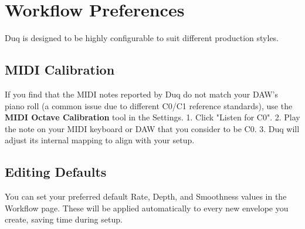 \chapter{Workflow Preferences}
\label{ch:workflow_preferences}

Duq is designed to be highly configurable to suit different production styles.

\section{MIDI Calibration}
If you find that the MIDI notes reported by Duq do not match your DAW's piano roll (a common issue due to different C0/C1 reference standards), use the \textbf{MIDI Octave Calibration} tool in the Settings.
1. Click "Listen for C0".
2. Play the note on your MIDI keyboard or DAW that you consider to be C0.
3. Duq will adjust its internal mapping to align with your setup.

\section{Editing Defaults}
You can set your preferred default Rate, Depth, and Smoothness values in the Workflow page. These will be applied automatically to every new envelope you create, saving time during setup.
